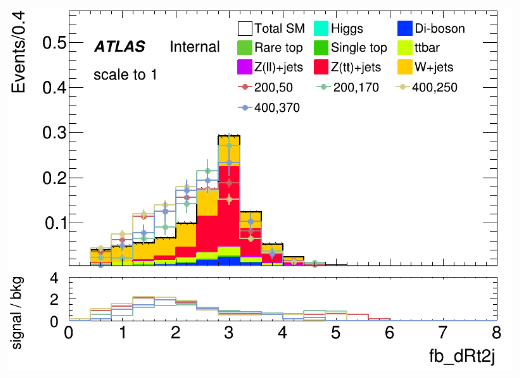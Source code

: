 \documentclass[usenames,dvipsnames]{beamer}
\begin{document}
\begin{frame}
\begin{minipage}{0.32\textwidth}
        \includegraphics[width=\textwidth]{graphics/HH_met_sig/HH_fb_dRt2j_norm.png}
    \end{minipage}
    
    \vspace{0.5cm} %


\end{frame}
\end{document}

